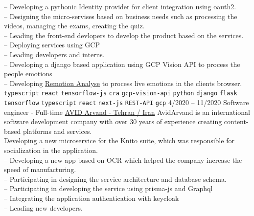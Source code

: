 \documentclass[9pt]{developercv}
\begin{document}
\begin{entrylist}
{		%
		-- Developing a pythonic Identity provider for client integration using oauth2. \\
		-- Designing the micro-servises based on business needs such as processing the videos, managing the exams, creating the quiz. \\
		-- Leading the front-end devlopers to develop the product based on the services. \\
		-- Deploying services using GCP \\
		-- Leading developers and interns. \\
		-- Developing a django based application using GCP Vision API to process the people emotions \\
		-- Developing \href{https://analyse.remotion.live/} {Remotion Analyse} to process live emotions in the clients browser. \\
		\texttt{typescript}\slashsep
		\texttt{react}\slashsep
		\texttt{tensorflow-js}\slashsep
		\texttt{cra}\slashsep
		\texttt{gcp-vision-api}\slashsep
		\texttt{python}\slashsep
		\texttt{django}\slashsep
		\texttt{flask}\slashsep
		\texttt{tensorflow}\slashsep
		\texttt{typescript}\slashsep
		\texttt{react}\slashsep
		\texttt{next-js}\slashsep
		\texttt{REST-API}\slashsep
		\texttt{gcp}\slashsep
	}
	\entry
	{4/2020 -- 11/2020}
	{Software engineer - Full-time}
	{
		\href{https://www.linkedin.com/company/avid-technology-development/}{AVID Arvand - Tehran / Iran}}
	{
		AvidArvand is an international software development company with over 30 years of experience creating content-based platforms and services. \\
		Developing a new microservice for the Knito suite, which was responsible for socialization in the application.\\
		-- Developing a new app based on OCR which helped
		the company increase the speed of manufacturing. \\
		-- Participating in designing the service architecture and database schema. \\
		-- Participating in developing the service using prisma-js and Graphql \\
		-- Integrating the application authentication with keycloak \\
		-- Leading new developers. \\
		
}
\end{entrylist}
\end{document}
